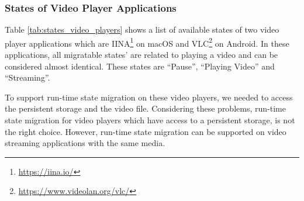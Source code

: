 \subsubsection{States of Video Player Applications}
Table \ref{tab:states_video_players} shows a list of available states of two video player applications which are IINA\footnote{\url{https://iina.io/}} on macOS and VLC\footnote{\url{https://www.videolan.org/vlc/}} on Android. In these applications, all migratable states' are related to playing a video and can be considered almost identical. These states are “Pause”, “Playing Video” and “Streaming”. 

To support run-time state migration on these video players, we needed to access the persistent storage	and the video file. Considering these problems, run-time state migration for video players which have access to a persistent storage, is not the right choice. However, run-time state migration can be supported on video streaming applications with the same media.



